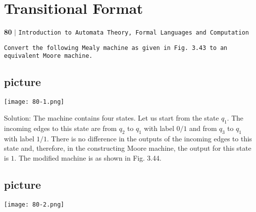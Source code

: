 \documentclass[9pt]{beamer}
\begin{document}
\begin{frame}
\section*{Transitional Format}
\begin{flushleft}
    \textbf{80}\hspace*{0.1cm} \textbf{$|$} \hspace*{0.1cm} \texttt{Introduction to Automata Theory, Formal Languages and Computation}
  \end{flushleft}

\vspace*{0.5cm}
 \hspace*{0.1cm} \texttt{Convert the following Mealy
machine as given in Fig. 3.43 to
an equivalent Moore machine.}\\

\pause
\begin{center}
\section{picture}
\texttt{[image: 80-1.png]}
\end{center}
\end{frame}

\begin{frame}
Solution: The machine contains four states. Let us
start from the state $q_1$. The incoming edges to this
state are from $q_2$ to $q_1$ with label $0/1$ and from $q_3$ to $q_1$
with label $1/1$. There is no difference in the outputs
of the incoming edges to this state and, therefore,
in the constructing Moore machine, the output for
this state is $1$. The modified machine is as shown in
Fig. 3.44.\\

\pause
\begin{center}
\section{picture}
\texttt{[image: 80-2.png]}
\end{center}
\end{frame}
\end{document}
